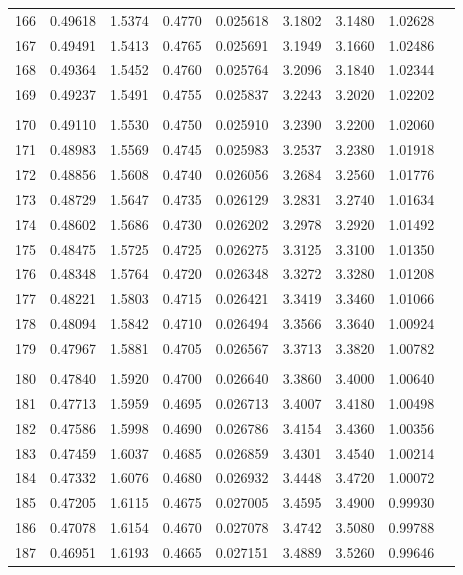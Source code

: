 \documentclass[letter,twosides,10pt]{article}
\begin{document}
\begin{longtable}{|c|c|c|c|c|c|c|c|c|}
166 & 0.49618 & 1.5374 & 0.4770 & 0.025618 & 3.1802 &  3.1480 & 1.02628 \\
167 & 0.49491 & 1.5413 & 0.4765 & 0.025691 & 3.1949 &  3.1660 & 1.02486 \\
168 & 0.49364 & 1.5452 & 0.4760 & 0.025764 & 3.2096 &  3.1840 & 1.02344 \\
169 & 0.49237 & 1.5491 & 0.4755 & 0.025837 & 3.2243 &  3.2020 & 1.02202 \\
 & & & & & & & \\
170 & 0.49110 & 1.5530 & 0.4750 & 0.025910 & 3.2390 &  3.2200 & 1.02060 \\
171 & 0.48983 & 1.5569 & 0.4745 & 0.025983 & 3.2537 &  3.2380 & 1.01918 \\
172 & 0.48856 & 1.5608 & 0.4740 & 0.026056 & 3.2684 &  3.2560 & 1.01776 \\
173 & 0.48729 & 1.5647 & 0.4735 & 0.026129 & 3.2831 &  3.2740 & 1.01634 \\
174 & 0.48602 & 1.5686 & 0.4730 & 0.026202 & 3.2978 &  3.2920 & 1.01492 \\
175 & 0.48475 & 1.5725 & 0.4725 & 0.026275 & 3.3125 &  3.3100 & 1.01350 \\
176 & 0.48348 & 1.5764 & 0.4720 & 0.026348 & 3.3272 &  3.3280 & 1.01208 \\
177 & 0.48221 & 1.5803 & 0.4715 & 0.026421 & 3.3419 &  3.3460 & 1.01066 \\
178 & 0.48094 & 1.5842 & 0.4710 & 0.026494 & 3.3566 &  3.3640 & 1.00924 \\
179 & 0.47967 & 1.5881 & 0.4705 & 0.026567 & 3.3713 &  3.3820 & 1.00782 \\
 & & & & & & & \\
180 & 0.47840 & 1.5920 & 0.4700 & 0.026640 & 3.3860 &  3.4000 & 1.00640 \\
181 & 0.47713 & 1.5959 & 0.4695 & 0.026713 & 3.4007 &  3.4180 & 1.00498 \\
182 & 0.47586 & 1.5998 & 0.4690 & 0.026786 & 3.4154 &  3.4360 & 1.00356 \\
183 & 0.47459 & 1.6037 & 0.4685 & 0.026859 & 3.4301 &  3.4540 & 1.00214 \\
184 & 0.47332 & 1.6076 & 0.4680 & 0.026932 & 3.4448 &  3.4720 & 1.00072 \\
185 & 0.47205 & 1.6115 & 0.4675 & 0.027005 & 3.4595 &  3.4900 & 0.99930 \\
186 & 0.47078 & 1.6154 & 0.4670 & 0.027078 & 3.4742 &  3.5080 & 0.99788 \\
187 & 0.46951 & 1.6193 & 0.4665 & 0.027151 & 3.4889 &  3.5260 & 0.99646 \\

\end{longtable}
\end{document}
